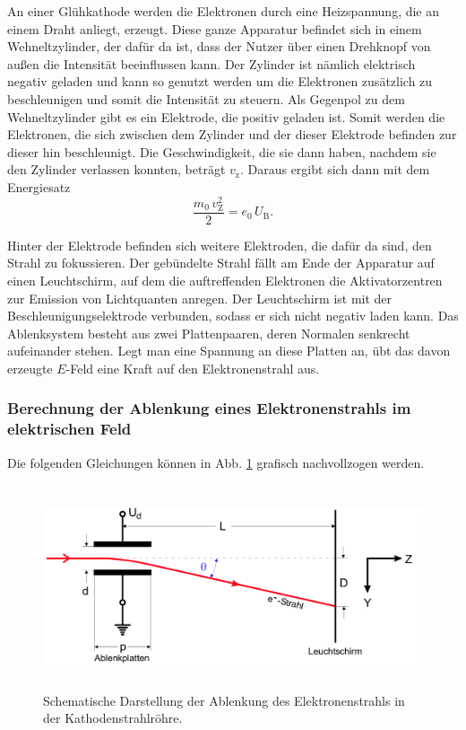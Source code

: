 \noindent An einer Glühkathode werden die Elektronen durch eine Heizspannung, die an einem Draht anliegt, erzeugt.  
Diese ganze Apparatur befindet sich in einem Wehneltzylinder, der dafür da ist, dass der Nutzer über einen Drehknopf von außen die Intensität beeinflussen kann. Der Zylinder ist nämlich elektrisch negativ geladen und kann so genutzt werden um die Elektronen zusätzlich zu beschleunigen und somit die Intensität zu steuern. 
Als Gegenpol zu dem Wehneltzylinder gibt es ein Elektrode, die positiv geladen ist. Somit werden die Elektronen, die sich zwischen dem Zylinder und der dieser Elektrode befinden zur dieser hin beschleunigt. Die Geschwindigkeit, die sie dann haben, nachdem sie den Zylinder verlassen konnten, beträgt $v_\text{z}$.  
Daraus ergibt sich dann mit dem Energiesatz  
\begin{equation}
    \frac{m_0 \, v_\text{Z}^2}{2} = e_\text{0} \, U_\text{B}.
    \label{eqn:energie}
\end{equation}

\noindent Hinter der Elektrode befinden sich weitere Elektroden, 
die dafür da sind, den Strahl zu fokussieren. Der gebündelte 
Strahl fällt am Ende der Apparatur auf einen Leuchtschirm, 
auf dem die auftreffenden Elektronen die Aktivatorzentren zur 
Emission von Lichtquanten anregen.
Der Leuchtschirm ist mit der Beschleunigungselektrode 
verbunden, sodass er sich nicht negativ laden kann.
Das Ablenksystem besteht aus zwei Plattenpaaren, deren Normalen 
senkrecht aufeinander stehen. Legt man eine Spannung an diese 
Platten an, übt das davon erzeugte $E$-Feld eine Kraft 
auf den Elektronenstrahl aus. 

\subsubsection{Berechnung der Ablenkung eines Elektronenstrahls im elektrischen Feld} %
Die folgenden Gleichungen können in Abb. \ref{fig:roehre2}
grafisch nachvollzogen werden.
\begin{figure}
    \centering
    \includegraphics[width=12cm, height=6cm]{build/roehre2.png}
    \caption{Schematische Darstellung der Ablenkung des
    Elektronenstrahls in der Kathodenstrahlröhre. \cite{V501}}
    \label{fig:roehre2}
\end{figure}

